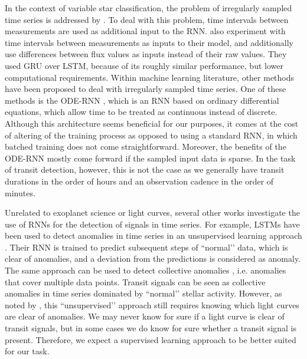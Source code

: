 In the context of variable star classification, the problem of irregularly sampled time series is addressed by \cite{naul2018recurrent}. To deal with this problem, time intervals between measurements are used as additional input to the RNN. \cite{becker2020scalable} also experiment with time intervals between measurements as inputs to their model, and additionally use differences between flux values as inputs instead of their raw values. They used GRU over LSTM, because of its roughly similar performance, but lower computational requirements. Within machine learning literature, other methods have been proposed to deal with irregularly sampled time series. One of these methods is the ODE-RNN \citep{rubanova2019latent, chen2018neural}, which is an RNN based on ordinary differential equations, which allow time to be treated as continuous instead of discrete. Although this architecture seems beneficial for our purposes, it comes at the cost of altering of the training process as opposed to using a standard RNN, in which batched training does not come straightforward. Moreover, the benefits of the ODE-RNN mostly come forward if the sampled input data is sparse. In the task of transit detection, however, this is not the case as we generally have transit durations in the order of hours and an observation cadence in the order of minutes.

Unrelated to exoplanet science or light curves, several other works investigate the use of RNNs for the detection of signals in time series. For example, LSTMs have been used to detect anomalies in time series in an unsupervised learning approach \citep{malhotra2015long}. Their RNN is trained to predict subsequent steps of ``normal’’ data, which is clear of anomalies, and a deviation from the predictions is considered as anomaly. The same approach can be used to detect collective anomalies \citep{bontemps2016collective}, i.e. anomalies that cover multiple data points. Transit signals can be seen as collective anomalies in time series dominated by ``normal’’ stellar activity. However, as noted by \cite{cherdo2020training}, this ``unsupervised’’ approach still requires knowing which light curves are clear of anomalies. We may never know for sure if a light curve is clear of transit signals, but in some cases we do know for sure whether a transit signal is present. Therefore, we expect a supervised learning approach to be better suited for our task.


